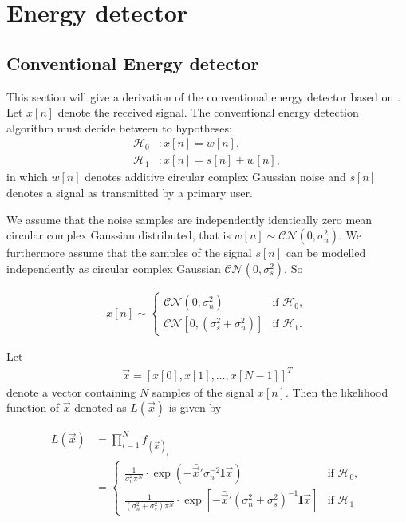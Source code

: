 \documentclass[a4paper, openany, oneside]{memoir}
\begin{document}
\section{Energy detector}

\subsection{Conventional Energy detector}\label{ssec:conv_ed_derivation}
This section will give a derivation of the conventional energy detector based on \cite{atapattu2014energy}.
Let $x[n]$ denote the received signal. The conventional energy detection algorithm must decide between to hypotheses:
\begin{align}\label{eq:hypotheses}
  \mathcal{H}_0&: x[n] = w[n],\\
  \mathcal{H}_1&: x[n] = s[n] + w[n],
\end{align}
in which $w[n]$ denotes additive circular complex Gaussian noise and $s[n]$ denotes a signal as transmitted by a primary user.

We assume that the noise samples are independently identically zero mean circular complex Gaussian distributed, that is $w[n] \sim \mathcal{CN}(0, \sigma_n^2)$. 
We furthermore assume that the samples of the signal $s[n]$ can be modelled independently as circular complex Gaussian $\mathcal{CN}(0, \sigma_s^2)$. %
So

\begin{align*}
x[n] \sim 
    \begin{cases}
        \mathcal{CN}(0, \sigma_n^2) & \text{if $\mathcal{H}_0$}, \\
        \mathcal{CN}[0, (\sigma_s^2 + \sigma_n^2)] & \text{if $\mathcal{H}_1$}.
    \end{cases}
\end{align*} 

Let
\begin{align*}
    \vec{x} = \left[x[0], x[1], \ldots, x[N-1]\right]^T
\end{align*}
denote a vector containing $N$ samples of the signal $x[n]$. Then the likelihood function of $\vec{x}$ denoted as $L(\vec{x})$ is given by

\begin{align*}
    L(\vec{x}) &= \prod_{i=1}^N f_{(\vec{x})_i}\\
    &= \begin{cases}
        \frac{1}{\sigma_n^2 \pi^N} \cdot \exp(-\bar{\vec{x}}'\sigma_n^{-2}\mathbf{I}\vec{x}) & \text{if $\mathcal{H}_0$}, \\
        \frac{1}{(\sigma_n^2 + \sigma_s^2) \pi^N} \cdot \exp[-\bar{\vec{x}}'(\sigma_n^2+\sigma_s^2)^{-1}\mathbf{I}\vec{x}] & \text{if $\mathcal{H}_1$}
    \end{cases}
\end{align*}
\end{document}
